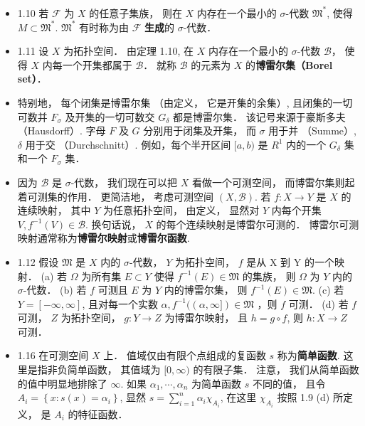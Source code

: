 \begin{itemize}
\item 1.10 若 $\mathscr{F}$ 为 $X$ 的任意子集族， 则在 $X$ 内存在一个最小的 $\sigma$-代数 $\mathfrak{M}^{*}$, 使得 $M \subset \mathfrak{M}^{*}$. $\mathfrak{M}^{*}$ 有时称为由 $\mathscr{F}$ \textbf{生成}的 $\sigma$-代数．

\item 1.11 设 $X$ 为拓扑空间． 由定理 1.10, 在 $X$ 内存在一个最小的 $\sigma$-代数 $\mathscr B$， 使得 $X$ 内每一个开集都属于 $\mathscr B$． 就称 $\mathscr B$ 的元素为 $X$ 的\textbf{博雷尔集（Borel set）}．

\item 特别地， 每个闭集是博雷尔集 （由定义， 它是开集的余集）, 且闭集的一切可数并 $F_{\sigma}$ 及开集的一切可数交 $G_{\delta}$ 都是博雷尔集． 该记号来源于豪斯多夫 （Hausdorff）. 字母 $F$ 及 $G$ 分别用于闭集及开集， 而 $\sigma$ 用于并 （Summe）, $\delta$ 用于交 （Durchschnitt）. 例如，每个半开区间 $[a, b)$ 是 $R^{1}$ 内的一个 $G_{\delta}$ 集和一个 $F_{\sigma}$ 集．

\item 因为 $\mathscr{B}$ 是 $\sigma$-代数， 我们现在可以把 $X$ 看做一个可测空间， 而博雷尔集则起着可测集的作用． 更简洁地， 考虑可测空间 $(X, \mathscr{B})$. 若 $f: X \rightarrow Y$ 是 $X$ 的连续映射， 其中 $Y$ 为任意拓扑空间， 由定义， 显然对 $Y$ 内每个开集 $V, f^{-1}(V) \in \mathscr{B}$. 换句话说， $X$ 的每个连续映射是博雷尔可测的． 博雷尔可测映射通常称为\textbf{博雷尔映射}或\textbf{博雷尔函数}.

\item 1.12 假设 $\mathfrak{M}$ 是 $X$ 内的 $\sigma$-代数， $Y$ 为拓扑空间， $f$ 是从 $\mathrm{X}$ 到 $\mathrm{Y}$ 的一个映射．
(a) 若 $\Omega$ 为所有集 $E \subset Y$ 使得 $f^{-1}(E) \in \mathfrak{M}$ 的集族， 则 $\Omega$ 为 $Y$ 内的 $\sigma$-代数．
(b) 若 $f$ 可测且 $E$ 为 $Y$ 内的博雷尔集， 则 $f^{-1}(E) \in \mathfrak{M}$.
(c) 若 $Y=[-\infty, \infty]$, 且对每一个实数 $\alpha, f^{-1}((\alpha, \infty]) \in \mathfrak{M}$ ，则 $f$ 可测．
(d) 若 $f$ 可测， $Z$ 为拓扑空间， $g: Y \rightarrow Z$ 为博雷尔映射， 且 $h=g \circ f$, 则 $h: X \rightarrow Z$ 可测．

\item 1.16 在可测空间 $X$ 上． 值域仅由有限个点组成的复函数 $s$ 称为\textbf{简单函数}. 这里是指非负简单函数， 其值域为 $[0, \infty)$ 的有限子集． 注意， 我们从简单函数的值中明显地排除了 $\infty$. 如果 $\alpha_{1}, \cdots, \alpha_{n}$ 为简单函数 $s$ 不同的值， 且令 $A_{i}=\left\{x: s(x)=\alpha_{i}\right\}$, 显然 $s=\sum_{i=1}^{n} \alpha_{i} \chi_{A_{i}}$, 在这里 $\chi_{A_{i}}$ 按照 1.9 (d) 所定义， 是 $A_{i}$ 的特征函数．


\end{itemize}
